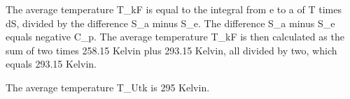 The average temperature T_kF is equal to the integral from e to a of T times dS, divided by the difference S_a minus S_e. The difference S_a minus S_e equals negative C_p. The average temperature T_kF is then calculated as the sum of two times 258.15 Kelvin plus 293.15 Kelvin, all divided by two, which equals 293.15 Kelvin.

The average temperature T_Utk is 295 Kelvin.